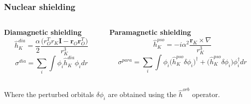 \begin{frame}
\frametitle{Nuclear shielding}
\begin{columns}

\begin{column}[b]{0.5\textwidth}
\centering
\textbf{Diamagnetic shielding}
\begin{equation}
    \nonumber
    \hat{h}_K^{dia} = \frac{\alpha}{2}\frac{\Big(r_O^Tr_K\boldsymbol{I} - 
    \boldsymbol{r}_O\boldsymbol{r}_O^T\Big)}{r_K^3}
\end{equation}
\vspace{2mm}
\begin{equation}
    \nonumber
    \sigma^{dia} = \sum_i \int \phi_i \hat{h}_K^{dia} \phi_i dr
\end{equation}
\end{column}

\begin{column}[b]{0.5\textwidth}
\centering
\textbf{Paramagnetic shielding}
\begin{equation}
    \nonumber
    \hat{h}_K^{pso} = -i \alpha^2 \frac{\boldsymbol{r}_K\times\nabla}{r_K^3}
\end{equation}
\vspace{2mm}
\begin{equation}
    \nonumber
    \sigma^{para} = \sum_i \int \phi_i \Big(\hat{h}_K^{pso} \delta\phi_i\Big)^\dag + 
    \Big(\hat{h}_K^{pso}\delta\phi_i\Big)\phi_i^\dag dr
\end{equation}
\end{column}

\end{columns}
\vspace{5mm}
\centering
Where the perturbed orbitals $\delta\phi_i$ are obtained using 
the $\hat{h}^{orb}$ operator.
\vspace{5mm}


\end{frame}
